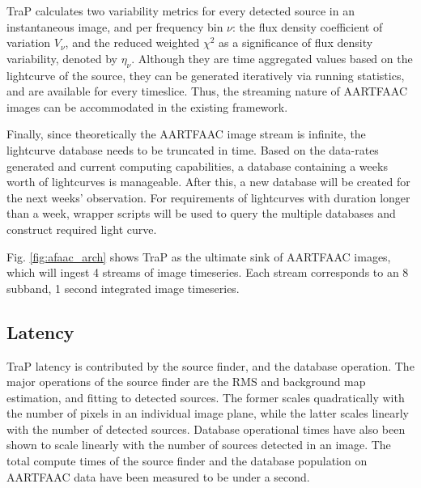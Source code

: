 \documentclass{ws-jai}
\begin{document}
TraP  calculates  two  variability  metrics  for every  detected  source  in  an
instantaneous image, and  per frequency bin $\nu$: the  flux density coefficient
of variation $V_{\nu}$,  and the reduced weighted $\chi^2$ as  a significance of
flux  density  variability, denoted  by  $\eta_{\nu}$.  Although they  are  time
aggregated values based  on the lightcurve of the source,  they can be generated
iteratively  via running  statistics,  and are  available  for every  timeslice.
Thus,  the streaming  nature  of  AARTFAAC images  can  be  accommodated in  the
existing framework.

Finally,  since  theoretically  the  AARTFAAC  image  stream  is  infinite,  the
lightcurve database  needs to  be truncated  in time.   Based on  the data-rates
generated  and current  computing capabilities,  a database  containing a  weeks
worth of lightcurves is manageable.  After  this, a new database will be created
for the next  weeks' observation. For requirements of  lightcurves with duration
longer than a week, wrapper scripts will be used to query the multiple databases
and construct required light curve.

Fig. \ref{fig:afaac_arch}  shows TraP as  the ultimate sink of  AARTFAAC images,
which will ingest 4 streams of image timeseries. Each stream corresponds to an 8
subband, 1 second integrated image timeseries.\\

\subsection {Latency}
TraP latency is contributed by  the source finder,
and the  database operation. The major  operations of the source  finder are the
RMS and background  map estimation, and fitting to detected  sources. The former
scales quadratically  with the number  of pixels  in an individual  image plane,
while the latter scales linearly with  the number of detected sources.  Database
operational times  have also  been shown  to scale linearly  with the  number of
sources detected  in an image. The  total compute times of  the source finder and
the  database population  on AARTFAAC  data  have been  measured to  be under  a
second.


\end{document}

